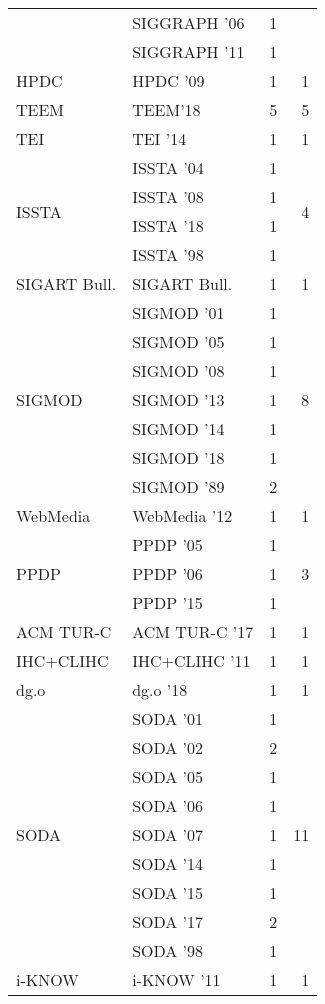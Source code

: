 \begin{table*}[t]
\begin{tabular}{llrr}
& SIGGRAPH '06 & 1 &\\
& SIGGRAPH '11 & 1 &\\
\multirow{1}{*}{HPDC } & HPDC '09 & 1 & \multirow{1}{*}{1}\\
\multirow{1}{*}{TEEM} & TEEM'18 & 5 & \multirow{1}{*}{5}\\
\multirow{1}{*}{TEI } & TEI '14 & 1 & \multirow{1}{*}{1}\\
\multirow{4}{*}{ISSTA } & ISSTA '04 & 1 & \multirow{4}{*}{4}\\
& ISSTA '08 & 1 &\\
& ISSTA '18 & 1 &\\
& ISSTA '98 & 1 &\\
\multirow{1}{*}{SIGART Bull.} & SIGART Bull. & 1 & \multirow{1}{*}{1}\\
\multirow{7}{*}{SIGMOD } & SIGMOD '01 & 1 & \multirow{7}{*}{8}\\
& SIGMOD '05 & 1 &\\
& SIGMOD '08 & 1 &\\
& SIGMOD '13 & 1 &\\
& SIGMOD '14 & 1 &\\
& SIGMOD '18 & 1 &\\
& SIGMOD '89 & 2 &\\
\multirow{1}{*}{WebMedia } & WebMedia '12 & 1 & \multirow{1}{*}{1}\\
\multirow{3}{*}{PPDP } & PPDP '05 & 1 & \multirow{3}{*}{3}\\
& PPDP '06 & 1 &\\
& PPDP '15 & 1 &\\
\multirow{1}{*}{ACM TUR-C } & ACM TUR-C '17 & 1 & \multirow{1}{*}{1}\\
\multirow{1}{*}{IHC+CLIHC } & IHC+CLIHC '11 & 1 & \multirow{1}{*}{1}\\
\multirow{1}{*}{dg.o } & dg.o '18 & 1 & \multirow{1}{*}{1}\\
\multirow{9}{*}{SODA } & SODA '01 & 1 & \multirow{9}{*}{11}\\
& SODA '02 & 2 &\\
& SODA '05 & 1 &\\
& SODA '06 & 1 &\\
& SODA '07 & 1 &\\
& SODA '14 & 1 &\\
& SODA '15 & 1 &\\
& SODA '17 & 2 &\\
& SODA '98 & 1 &\\
\multirow{1}{*}{i-KNOW } & i-KNOW '11 & 1 & \multirow{1}{*}{1}\\

\end{tabular}
\end{table*}
